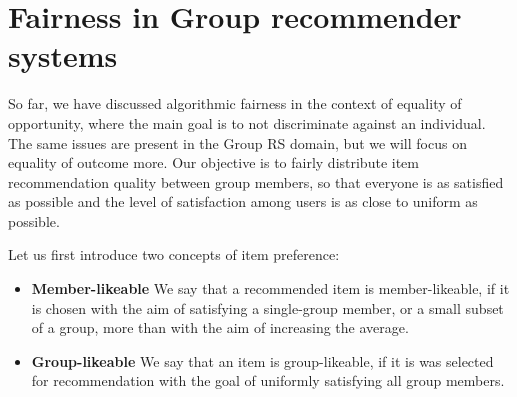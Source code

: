



\section{Fairness in Group recommender systems} \label{sec:02_fairness_in_grs}



So far, we have discussed algorithmic fairness in the context of equality of opportunity, where the main goal is to not discriminate against an individual. The same issues are present in the Group RS domain, but we will focus on equality of outcome more. %
Our objective is to fairly distribute item recommendation quality between group members, so that everyone is as satisfied as possible and the level of satisfaction among users is as close to uniform as possible.

Let us first introduce two concepts of item preference:
\begin{itemize}
    \item \textbf{Member-likeable}\newline
    We say that a recommended item is member-likeable, if it is chosen with the aim of satisfying a single-group member, or a small subset of a group, more than with the aim of increasing the average.
    \item \textbf{Group-likeable}\newline
    We say that an item is group-likeable, if it is was selected for recommendation with the goal of uniformly satisfying all group members.
\end{itemize}

